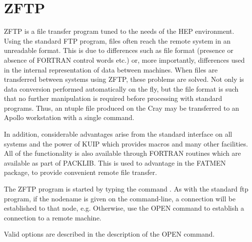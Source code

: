 
\chapter{ZFTP}

ZFTP is a file transfer program tuned to the needs of the HEP environment.
Using the standard FTP program, files often reach the remote system
in an unreadable format. This is due to differences such as file format
(presence or absence of FORTRAN control words etc.) or, more importantly,
differences used in the internal representation of data between machines.
When files are transferred between systems using ZFTP, these problems
are solved. Not only is data conversion performed automatically on the fly,
but the file format is such that no further manipulation is required before
processing with standard programs. Thus, an ntuple file produced on the
Cray may be transferred to an Apollo workstation with a single command.
\par
In addition, considerable advantages arise from the standard interface
on all systems and the power of KUIP which provides macros and many other
facilities. All of the functionality is also available through FORTRAN
routines which are available as part of PACKLIB. This is used to advantage
in the FATMEN package, to provide convenient remote file transfer.
\par
The ZFTP program is started by typing the command .
As with the standard ftp program, if the nodename is given
on the command-line, a connection will be established to that
node, e.g. 
Otherwise, use the OPEN command to establish a connection to a remote
machine.
\par
Valid options are described in the description of the OPEN command.
